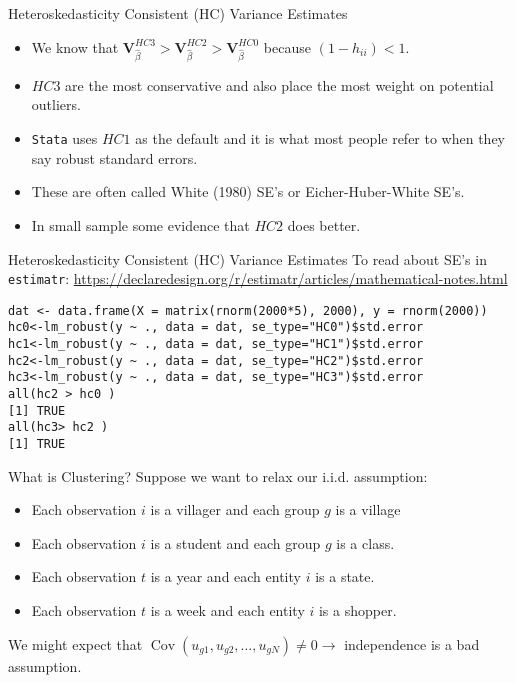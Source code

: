 \documentclass[aspectratio=169]{beamer}
\begin{document}
\begin{frame}{Heteroskedasticity Consistent (HC) Variance Estimates}
\begin{itemize}
\item We know that $\mathbf{V}_{\widehat{\beta}}^{HC3} > \mathbf{V}_{\widehat{\beta}}^{HC2} > \mathbf{V}_{\widehat{\beta}}^{HC0}$ because $(1- h_{ii}) <1$.
\item $HC3$ are the most \alert{conservative} and also place the most weight on potential outliers.
\item \texttt{Stata} uses $HC1$ as the default and it is what most people refer to when they say \alert{robust standard errors}.
\item These are often called White (1980) SE's or Eicher-Huber-White SE's.
\item In small sample some evidence that $HC2$ does better.
\end{itemize}
\end{frame}

\begin{frame}[fragile]{Heteroskedasticity Consistent (HC) Variance Estimates}
\footnotesize
To read about SE's in \texttt{estimatr}:
\url{ https://declaredesign.org/r/estimatr/articles/mathematical-notes.html}
\begin{verbatim}
dat <- data.frame(X = matrix(rnorm(2000*5), 2000), y = rnorm(2000))
hc0<-lm_robust(y ~ ., data = dat, se_type="HC0")$std.error
hc1<-lm_robust(y ~ ., data = dat, se_type="HC1")$std.error
hc2<-lm_robust(y ~ ., data = dat, se_type="HC2")$std.error
hc3<-lm_robust(y ~ ., data = dat, se_type="HC3")$std.error
all(hc2 > hc0 )
[1] TRUE
all(hc3> hc2 )
[1] TRUE
\end{verbatim}
\end{frame}

\begin{frame}{What is Clustering?}
Suppose we want to relax our i.i.d. assumption:
\begin{itemize}
\item Each observation $i$ is a \alert{villager} and each group $g$ is a \alert{village}
\item Each observation $i$ is a \alert{student} and each group $g$ is a \alert{class}.
\item Each observation $t$ is a \alert{year} and each entity $i$ is a \alert{state}.
\item Each observation $t$ is a \alert{week} and each entity $i$ is a \alert{shopper}.
\end{itemize}
We might expect that $\operatorname { Cov } (u_{g1},u_{g2},\ldots,u_{gN}) \neq 0 \rightarrow$ independence is a bad assumption. 
\end{frame}
\end{document}
